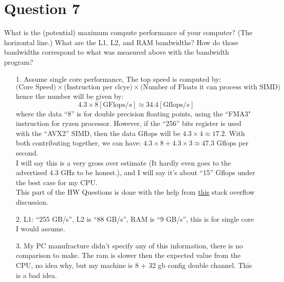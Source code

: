\documentclass[]{article}
\begin{document}
\section*{Question 7}
    What is the (potential) maximum compute performance of your computer?  (The horizontal line.)  What are the L1, L2, and RAM bandwidths?  How do those bandwidths correspond to  what was measured above with the bandwidth program?
    \begin{enumerate}
        \item [1.]
        Assume single core performance, The top speed is computed by: 
        $$
            \text{(Core Speed)} 
            \times 
            \text{(Instruction per clcye)}
            \times
            \text{(Number of Floats it can process with SIMD)}
        $$
        hence the number will be given by: 
        $$
        4.3 \times 8 [\text{GFlops}/s] \approx 34.4 [\text{Gflops}/s]
        $$
        where the data ``8'' is for double precision floating points, using the ``FMA3" instruction for ryzen processor. However, if the ``256'' bits register is used with the ``AVX2'' SIMD, then the data Gflops will be $4.3\times 4\approx 17.2$. With both contributing together, we can have: $4.3\times 8 + 4.3\times 3\approx 47.3$ Gflops per second. 
        \\[1.1em]
        I will say this is a very gross over estimate (It hardly even goes to the advertised 4.3 GHz to be honest.), and I will say it's about ``15'' Gflops under the best case for my CPU.
        \\[1.1em]
        This part of the HW Questions is done with the help from \href{https://stackoverflow.com/questions/15655835/flops-per-cycle-for-sandy-bridge-and-haswell-sse2-avx-avx2}{this} stack overflow discussion. 
        
        \item[2.] L1:  ``255 GB/s'', L2 is ``88 GB/s'', RAM is ``9 GB/s'', this is for single core I would assume. 
        \item[3.] My PC manufracture didn't specify any of this information, there is no comparison to make. The ram is slower then the expected value from the CPU, no idea why, but my machine is 8 + 32 gb config double channel. This is a bad idea. 
    \end{enumerate}
    
\end{document}
